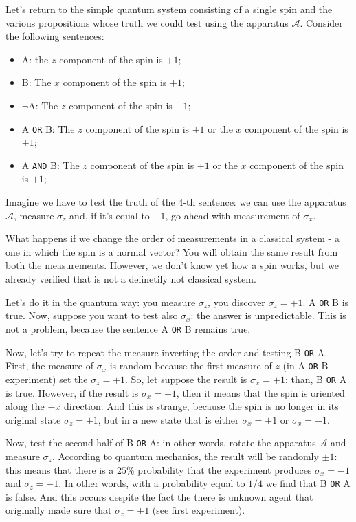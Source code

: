\documentclass[a4paper,10pt]{article}
\begin{document}
Let's return to the simple quantum system consisting of a single spin and the various propositions whose truth we could test using the apparatus $\mathcal{A}$. Consider the following sentences:
\begin{itemize}
    \item A: the $z$ component of the spin is $+1$;
    \item B: The $x$ component of the spin is $+1$;
    \item $\neg$A: The $z$ component of the spin is $-1$;
    \item A \texttt{OR} B: The $z$ component of the spin is $+1$ or the $x$ component of the spin is $+1$;
    \item A \texttt{AND} B: The $z$ component of the spin is $+1$ or the $x$ component of the spin is $+1$;
\end{itemize}

Imagine we have to test the truth of the $4$-th sentence: we can use the apparatus $\mathcal{A}$, measure $\sigma_z$ and, if it's equal to $-1$, go ahead with measurement of $\sigma_x$.

What happens if we change the order of measurements in a classical system - a one in which the spin is a normal vector? You will obtain the same result from both the measurements. However, we don't know yet how a spin works, but we already verified that is not a definetily not classical system.

Let's do it in the quantum way: you measure $\sigma_z$, you discover $\sigma_z = +1$. A \texttt{OR} B is true. Now, suppose you want to test also $\sigma_x$: the answer is unpredictable. This is not a problem, because the sentence A \texttt{OR} B remains true.

Now, let's try to repeat the measure inverting the order and testing B \texttt{OR} A. First, the measure of $\sigma_x$ is random because the first measure of $z$ (in A \texttt{OR} B experiment) set the $\sigma_z = +1$. So, let suppose the result is $\sigma_x = +1$: than, B \texttt{OR} A is true. However, if the result is $\sigma_x = -1$, then it means that the spin is oriented along the $-x$ direction. And this is strange, because the spin is no longer in its original state $\sigma_z = +1$, but in a new state that is either $\sigma_x = +1$ or $\sigma_x = -1$.

Now, test the second half of B \texttt{OR} A: in other words, rotate the apparatus $\mathcal{A}$ and measure $\sigma_z$. According to quantum mechanics, the result will be randomly $\pm 1$: this means that there is a $25\%$ probability that the experiment produces $\sigma_x = -1$ and $\sigma_z = -1$. In other words, with a probability equal to $1/4$ we find that B \texttt{OR} A is false. And this occurs despite the fact the there is unknown agent that originally made sure that $\sigma_z = +1$ (see first experiment).
\end{document}
